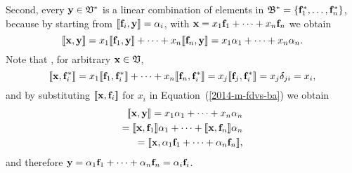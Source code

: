 Second,  every ${\bf y} \in {\frak V}^\ast $ is a linear combination of elements in
${\frak B}^\ast  = \{{\bf f}_1^\ast ,\ldots , {\bf f}_n^\ast \}$, because by
starting from
$\llbracket {\bf f}_i,  {\bf y}\rrbracket =\alpha_i$,
with
$ {\bf x} = x_1 {\bf f}_1 +\cdots + x_n {\bf f}_n$
we obtain
\begin{equation}
 \llbracket {\bf x},{\bf y}\rrbracket
= x_1 \llbracket {\bf f}_1,{\bf y}\rrbracket  +\cdots + x_n \llbracket {\bf f}_n,{\bf y}\rrbracket
= x_1 \alpha_1 +\cdots + x_n \alpha_n.
\label{2014-m-fdvs-ba}
\end{equation}
Note that , for arbitrary  ${\bf x}\in {\frak V}$,
\begin{equation}
 \llbracket {\bf x},{\bf f}_i^\ast \rrbracket
= x_1 \llbracket {\bf f}_1,{\bf f}_i^\ast \rrbracket  +\cdots + x_n \llbracket {\bf f}_n,{\bf f}_i^\ast \rrbracket =  x_j \llbracket {\bf f}_j,{\bf f}_i^\ast \rrbracket =  x_j \delta_{ji}=  x_i,
\label{2014-m-ch-fdlvs-kju}
\end{equation}
and by substituting $\llbracket {\bf x},{\bf f}_i\rrbracket $ for $x_i$ in Equation~(\ref{2014-m-fdvs-ba}) we obtain
\begin{equation}
\begin{split}
 \llbracket {\bf x},{\bf y}\rrbracket  =
 x_1\alpha_1 +\cdots + x_n \alpha_n \\
= \llbracket {\bf x},{\bf f}_1\rrbracket  \alpha_1 +\cdots + \llbracket {\bf x},{\bf f}_n\rrbracket  \alpha_n  \\
= \llbracket {\bf x},\alpha_1 {\bf f}_1 +\cdots + \alpha_n{\bf f}_n\rrbracket  ,
\label{2014-m-fdvs-ba1}
\end{split}
\end{equation}
and therefore ${\bf y} =\alpha_1 {\bf f}_1 +\cdots + \alpha_n{\bf f}_n=\alpha_i{\bf f}_i$.


